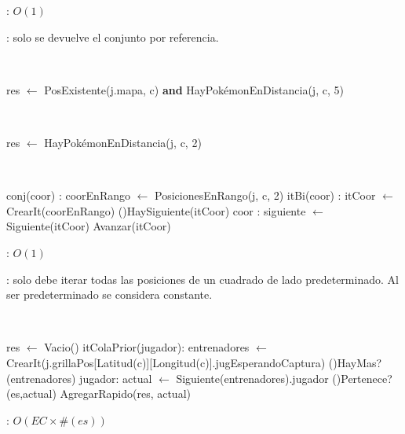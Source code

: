 \begin{Algoritmos}
	\complejidad: $O(1)$

	\justifcomp: solo se devuelve el conjunto por referencia.

	~

	\begin{algorithm}[H]
		\NoCaptionOfAlgo
		\caption{}
		res $\leftarrow$ PosExistente(j.mapa, c) \textbf{and} HayPokémonEnDistancia(j, c, 5)
	\end{algorithm}

	~

	\begin{algorithm}[H]
		\NoCaptionOfAlgo
		\caption{}
		res $\leftarrow$ HayPokémonEnDistancia(j, c, 2)
	\end{algorithm}

	~

	\begin{algorithm}[H]
		\NoCaptionOfAlgo
		\caption{}
		conj(coor) : coorEnRango $\leftarrow$ PosicionesEnRango(j, c, 2)
		itBi(coor) : itCoor $\leftarrow$ CrearIt(coorEnRango)
		\While(){HaySiguiente(itCoor)}{
			coor : siguiente $\leftarrow$ Siguiente(itCoor)
			Avanzar(itCoor)
		}
	\end{algorithm}

	\complejidad: $O(1)$

	\justifcomp: solo debe iterar todas las posiciones de un cuadrado de lado predeterminado. Al ser predeterminado se considera constante.

	~

	\begin{algorithm}[H]
		\NoCaptionOfAlgo
		\caption{}
		res $\leftarrow$ Vacio()
		itColaPrior(jugador): entrenadores $\leftarrow$ CrearIt(j.grillaPos[Latitud(c)][Longitud(c)].jugEsperandoCaptura)
		\While(){HayMas?(entrenadores)}{
			jugador: actual $\leftarrow$ Siguiente(entrenadores).jugador
			\If(){Pertenece?(es,actual)}{
				AgregarRapido(res, actual)
			}
		}
	\end{algorithm}

	\complejidad: $O(EC \times \#(es))$


\end{Algoritmos}
